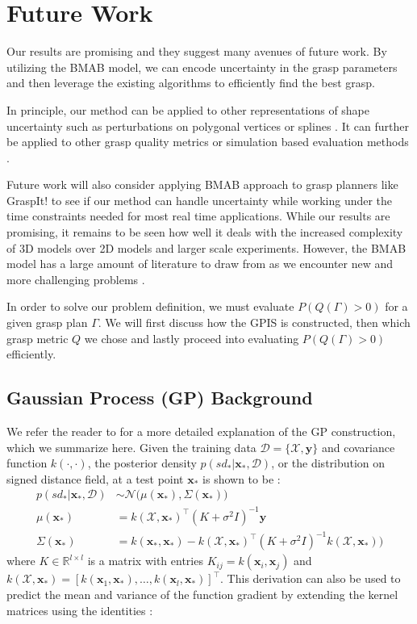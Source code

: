 \documentclass[journal,transmag]{IEEEtran}%
\newcommand{\by}{\mathbf{y}}
\newcommand{\bx}{\mathbf{x}}
\newcommand{\mX}{\mathcal{X}}
\newcommand{\mD}{\mathcal{D}}
\newcommand{\mN}{\mathcal{N}}
\begin{document}
\section{Future Work}
Our results are promising and they suggest many avenues of future work. By utilizing the BMAB model, we can encode uncertainty in the grasp parameters and then leverage the existing algorithms to efficiently find the best grasp. 

In principle, our method can be applied to other representations of shape uncertainty such as perturbations on polygonal vertices \cite{kehoe2012estimating} or splines \cite{christopoulos2007handling}.
It can further be applied to other grasp quality metrics or simulation based evaluation methods \cite{73}. 

Future work will also consider applying BMAB approach to grasp planners like GraspIt! \cite{miller2004graspit} to see if our method can handle uncertainty while working under the time constraints needed for most real time applications. While our results are promising, it remains to be seen how well it deals with the increased complexity of 3D models over 2D models and larger scale experiments. However, the BMAB model has a large amount of literature to draw from as we encounter new and more challenging problems \cite{bergemann2006bandit}.





 \label{sec:Appendix}
 In order to solve our problem definition, we must evaluate $P(Q(\Gamma)>0)$ for a given grasp plan $\Gamma$. We will first discuss how the GPIS is constructed, then which grasp metric $Q$ we chose and lastly proceed into evaluating $P(Q(\Gamma)>0)$ efficiently. 


\subsection{Gaussian Process (GP) Background}\label{sec:GP}
We refer the reader to \cite{mahler2015opt} for a more detailed explanation of the GP construction, which we summarize here.  Given the training data $\mD = \{\mX, \by\}$ and covariance function $k(\cdot,\cdot)$, the posterior density $p(sd_*|\bx_*,\mD)$, or the distribution on signed distance field, at a test point $\bx_{*}$ is shown to be \cite{rasmussen2010gaussian}:
\begin{align*}
	p(sd_*|\bx_*,\mD) &\sim \mN\big(\mu(\bx_*), \Sigma(\bx_*)\big) \\
	\mu(\bx_*) &= k(\mX,\bx_*)^{\intercal}(K + \sigma^2I)^{-1}\by \\
	\Sigma(\bx_*) &= k(\bx_*,\bx_*)-k(\mX,\bx_*)^{\intercal}(K+\sigma^2I)^{-1}k(\mX,\bx_*)\big) 
\end{align*}
where $K \in \mathbb{R}^{l \times l}$ is a matrix with entries $K_{ij} = k(\bx_i,\bx_j)$ and $k(\mX,\bx_*) = [k(\bx_1,\bx_*),\ldots,k(\bx_l,\bx_*)]^{\intercal}$. 
This derivation can also be used to predict the mean and variance of the function gradient by extending the kernel matrices using the identities \cite{solak2003derivative}:
\end{document}
